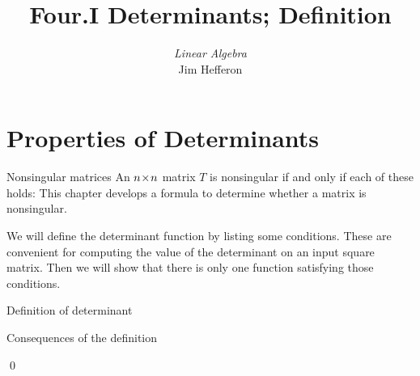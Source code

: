 \documentclass[10pt,t]{beamer}
\title[Determinants] %
{Four.I Determinants; Definition}
\author{\textit{Linear Algebra} \\ {\small Jim Hef{}feron}}
\institute{
  \texttt{http://joshua.smcvt.edu/linearalgebra}
}
\date{}
\begin{document}
\begin{frame}
  \titlepage
\end{frame}




\section{Properties of Determinants}
\begin{frame}{Nonsingular matrices}
An \( n \! \times \! n \) matrix \( T \) is nonsingular if and only if
each of these holds:%
This chapter develops a formula to determine whether a
matrix is nonsingular.
\end{frame}




\begin{frame}
\end{frame}




\begin{frame}
We will define the determinant function by listing 
some conditions.
These are convenient for computing the value of the determinant
on an input square matrix. 
Then we will show that there is only one function satisfying those
conditions.

\end{frame}




\begin{frame}{Definition of determinant}

\pause 
{} 
\end{frame}




\begin{frame}{Consequences of the definition}
\lm[le:IdenRowsDetZero]

\pause 
\pf 
{}

\pause
{}
\end{frame}
\begin{frame}

\pause
{}  
\end{frame}
\begin{frame}
\qed
\end{frame}
\end{document}
